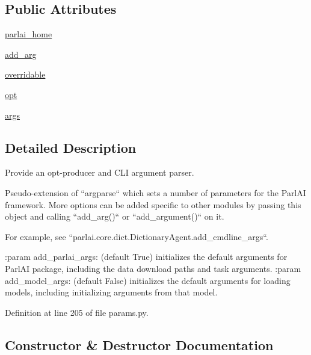 \subsection*{Public Attributes}
\begin{DoxyCompactItemize}
\item 
\hyperlink{classparlai_1_1core_1_1params_1_1ParlaiParser_a5ec04b6d66c84a0418930aac367bcc35}{parlai\+\_\+home}
\item 
\hyperlink{classparlai_1_1core_1_1params_1_1ParlaiParser_a7049960456af2af847ac8721d93cda0a}{add\+\_\+arg}
\item 
\hyperlink{classparlai_1_1core_1_1params_1_1ParlaiParser_a553d6c6c3576b217b0602befa0325e6a}{overridable}
\item 
\hyperlink{classparlai_1_1core_1_1params_1_1ParlaiParser_aa7c461e146b468d033fea1d1dcd92bcf}{opt}
\item 
\hyperlink{classparlai_1_1core_1_1params_1_1ParlaiParser_a27d35bfa073588bf887cbdbf45c19f39}{args}
\end{DoxyCompactItemize}


\subsection{Detailed Description}
\begin{DoxyVerb}Provide an opt-producer and CLI argument parser.

Pseudo-extension of ``argparse`` which sets a number of parameters
for the ParlAI framework. More options can be added specific to other
modules by passing this object and calling ``add_arg()`` or
``add_argument()`` on it.

For example, see ``parlai.core.dict.DictionaryAgent.add_cmdline_args``.

:param add_parlai_args:
    (default True) initializes the default arguments for ParlAI
    package, including the data download paths and task arguments.
:param add_model_args:
    (default False) initializes the default arguments for loading
    models, including initializing arguments from that model.
\end{DoxyVerb}
 

Definition at line 205 of file params.\+py.



\subsection{Constructor \& Destructor Documentation}
\mbox{\label{classparlai_1_1core_1_1params_1_1ParlaiParser_ab1d55b343c804984783548bec009a695}} 
